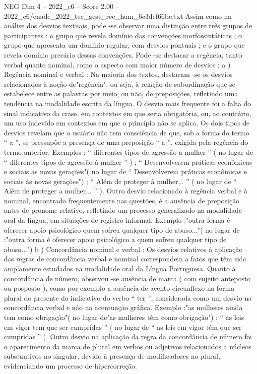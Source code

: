 \begin{textsample}{NEG Dim 4 – 2022\_c6 – Score 2.00 – 2022\_c6/enade\_2022\_tec\_gest\_rec\_hum\_6c3def66be.txt}
Assim como na análise dos desvios textuais, pode -se observar uma distinção entre três grupos de participantes : o grupo que revela domínio das convenções morfossintáticas ; o grupo que apresenta um domínio regular, com desvios pontuais ; e o grupo que revela domínio precário dessas convenções.
Pode -se destacar a regência, tanto verbal quanto nominal, como o aspecto com maior número de desvios : a ) Regência nominal e verbal : Na maioria dos textos, destacam -se os desvios relacionados à noção de"regência", ou seja, à relação de subordinação que se estabelece entre as palavras por meio, ou não, de preposições, refletindo uma tendência na modalidade escrita da língua.
O desvio mais frequente foi a falta do sinal indicativo da crase, em contextos em que seria obrigatória, ou, ao contrário, um uso indevido em contextos em que o princípio não se aplica.
Os dois tipos de desvios revelam que o usuário não tem consciência de que, sob a forma do termo “ a ”, se pressupõe a presença de uma preposição “ a ”, exigida pela regência do termo anterior.
Exemplos : “ diferentes tipos de agressão a mulher ” ( no lugar de “ diferentes tipos de agressão à mulher ” ) ; “ Desenvolverem práticas econômicas e sociais as novas gerações"( no lugar de “ Desenvolverem práticas econômicas e sociais às novas gerações") ; “ Além de proteger à mulher... ” ( no lugar de “ Além de proteger a mulher... ” ).
Outro desvio relacionado à regência verbal e à nominal, encontrado frequentemente nas questões, é a ausência de preposição antes de pronome relativo, refletindo um processo generalizado na modalidade oral da língua, em situações de registro informal.
Exemplo :"outra forma é oferecer apoio psicológico quem sofreu qualquer tipo de abuso..."( no lugar de :"outra forma é oferecer apoio psicológico a quem sofreu qualquer tipo de abuso...") b ) Concordância nominal e verbal : Os desvios relativos à aplicação das regras de concordância verbal e nominal correspondem a fatos que têm sido amplamente estudados na modalidade oral da Língua Portuguesa.
Quanto à concordância de número, observou -se ausência de marca ( com sujeito anteposto ou posposto ), como por exemplo a ausência de acento circunflexo na forma plural do presente do indicativo do verbo “ ter ”, considerada como um desvio na concordância verbal e não na acentuação gráfica.
Exemplo :"as mulheres ainda tem como obrigação"( no lugar de"as mulheres têm como obrigação") ; “ as leis em vigor tem que ser cumpridas ” ( no lugar de “ as leis em vigor têm que ser cumpridas ” ).
Outro desvio na aplicação da regra da concordância de número foi o aparecimento da marca de plural em verbos ou adjetivos relacionados a núcleos substantivos no singular, devido à presença de modificadores no plural, evidenciando um processo de hipercorreção.

\end{textsample}
